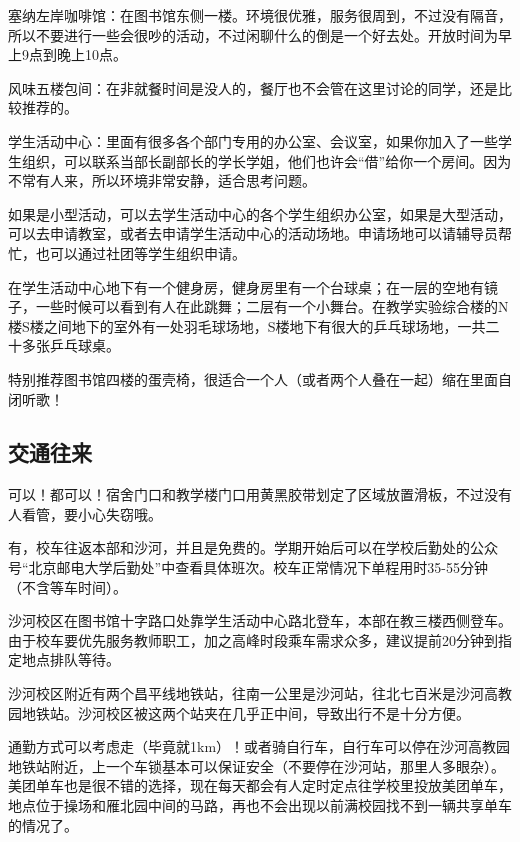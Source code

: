 塞纳左岸咖啡馆：在图书馆东侧一楼。环境很优雅，服务很周到，不过没有隔音，所以不要进行一些会很吵的活动，不过闲聊什么的倒是一个好去处。开放时间为早上9点到晚上10点。

风味五楼包间：在非就餐时间是没人的，餐厅也不会管在这里讨论的同学，还是比较推荐的。

学生活动中心：里面有很多各个部门专用的办公室、会议室，如果你加入了一些学生组织，可以联系当部长副部长的学长学姐，他们也许会“借”给你一个房间。因为不常有人来，所以环境非常安静，适合思考问题。


如果是小型活动，可以去学生活动中心的各个学生组织办公室，如果是大型活动，可以去申请教室，或者去申请学生活动中心的活动场地。申请场地可以请辅导员帮忙，也可以通过社团等学生组织申请。

在学生活动中心地下有一个健身房，健身房里有一个台球桌；在一层的空地有镜子，一些时候可以看到有人在此跳舞；二层有一个小舞台。在教学实验综合楼的N楼S楼之间地下的室外有一处羽毛球场地，S楼地下有很大的乒乓球场地，一共二十多张乒乓球桌。


特别推荐图书馆四楼的蛋壳椅，很适合一个人（或者两个人叠在一起）缩在里面自闭听歌！

\subsection{交通往来}


可以！都可以！宿舍门口和教学楼门口用黄黑胶带划定了区域放置滑板，不过没有人看管，要小心失窃哦。


有，校车往返本部和沙河，并且是免费的。学期开始后可以在学校后勤处的公众号“北京邮电大学后勤处”中查看具体班次。校车正常情况下单程用时35-55分钟（不含等车时间）。

沙河校区在图书馆十字路口处靠学生活动中心路北登车，本部在教三楼西侧登车。由于校车要优先服务教师职工，加之高峰时段乘车需求众多，建议提前20分钟到指定地点排队等待。


沙河校区附近有两个昌平线地铁站，往南一公里是沙河站，往北七百米是沙河高教园地铁站。沙河校区被这两个站夹在几乎正中间，导致出行不是十分方便。

通勤方式可以考虑走（毕竟就1km）！或者骑自行车，自行车可以停在沙河高教园地铁站附近，上一个车锁基本可以保证安全（不要停在沙河站，那里人多眼杂）。美团单车也是很不错的选择，现在每天都会有人定时定点往学校里投放美团单车，地点位于操场和雁北园中间的马路，再也不会出现以前满校园找不到一辆共享单车的情况了。

